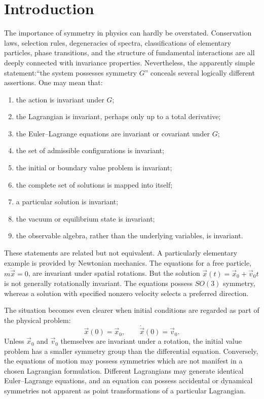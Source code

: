 \section{ Introduction}
The importance of symmetry in physics can hardly be overstated.  Conservation
laws, selection rules, degeneracies of spectra, classifications of elementary
particles, phase transitions, and the structure of fundamental interactions are
all deeply connected with invariance properties.
Nevertheless, the apparently simple statement:``the system possesses symmetry $G$''
conceals several logically different assertions.
One may mean that:
\begin{enumerate}
\item the action is invariant under $G$;
\item the Lagrangian is invariant, perhaps only up to a total derivative;
\item the Euler--Lagrange equations are invariant or covariant under $G$;
\item the set of admissible configurations is invariant;
\item the initial or boundary value problem is invariant;
\item the complete set of solutions is mapped into itself;
\item a particular solution is invariant;
\item the vacuum or equilibrium state is invariant;
\item the observable algebra, rather than the underlying variables, is invariant.
\end{enumerate}
These statements are related but not equivalent.
A particularly elementary example is provided by Newtonian mechanics.  The
equations for a free particle,$m \ddot{\vec x}=0$,
are invariant under spatial rotations.  But the solution
$\vec{x}(t)=\vec{x}_0+\vec{v}_0 t$ 
is not generally rotationally invariant.  The equations possess $SO(3)$
symmetry, whereas a solution with specified nonzero velocity selects a
preferred direction.

The situation becomes even clearer when initial conditions are regarded as part
of the physical problem:
\[\vec{x}(0)=\vec{x}_0,\qquad \dot{\vec{x}}(0)=\vec{v}_0.\]
Unless $\vec{x}_0$ and $\vec{v}_0$ themselves are invariant under a rotation,
the initial value problem has a smaller symmetry group than the differential
equation.
Conversely, the equations of motion may possess symmetries which are not
manifest in a chosen Lagrangian formulation.  Different Lagrangians may
generate identical Euler--Lagrange equations, and an equation can possess
accidental or dynamical symmetries not apparent as point transformations of a
particular Lagrangian.

